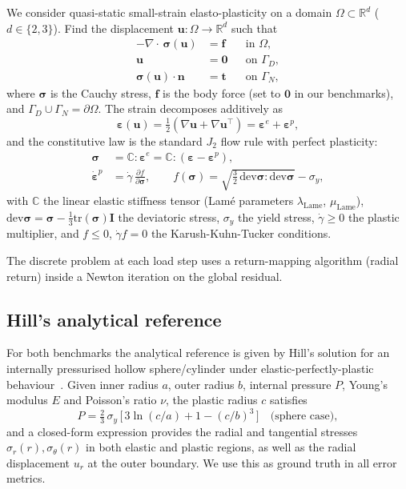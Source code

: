 \documentclass[11pt,a4paper]{article}
\newcommand{\bsigma}{\boldsymbol{\sigma}}
\newcommand{\beps}{\boldsymbol{\varepsilon}}
\newcommand{\bu}{\mathbf{u}}
\newcommand{\bff}{\mathbf{f}}
\newcommand{\bn}{\mathbf{n}}
\newcommand{\bI}{\mathbf{I}}
\newcommand{\dev}{\mathrm{dev}}
\newcommand{\tr}{\mathrm{tr}}
\newcommand{\divg}{\nabla \cdot}
\begin{document}
We consider quasi-static small-strain elasto-plasticity on a domain
$\Omega \subset \mathbb{R}^d$ ($d \in \{2,3\}$).  Find the displacement
$\bu : \Omega \to \mathbb{R}^d$ such that
\begin{align}
    -\divg\,\bsigma(\bu)            &= \bff           &&\text{in } \Omega, \\
    \bu                              &= \mathbf{0}    &&\text{on } \Gamma_D, \\
    \bsigma(\bu)\cdot\bn              &= \mathbf{t}    &&\text{on } \Gamma_N,
\end{align}
where $\bsigma$ is the Cauchy stress, $\bff$ is the body force
(set to $\mathbf{0}$ in our benchmarks), and $\Gamma_D \cup \Gamma_N =
\partial\Omega$.  The strain decomposes additively as
\begin{equation}
    \beps(\bu) = \tfrac{1}{2}(\nabla \bu + \nabla \bu^\top)
              = \beps^e + \beps^p,
\end{equation}
and the constitutive law is the standard $J_2$ flow rule with perfect
plasticity:
\begin{align}
    \bsigma           &= \mathbb{C} : \beps^e
                       = \mathbb{C} : (\beps - \beps^p), \\
    \dot{\beps}^p     &= \dot{\gamma}\,\frac{\partial f}{\partial \bsigma},
                       \qquad
    f(\bsigma) = \sqrt{\tfrac{3}{2}\,\dev\bsigma : \dev\bsigma} - \sigma_y,
\end{align}
with $\mathbb{C}$ the linear elastic stiffness tensor (Lamé parameters
$\lambda_{\mathrm{Lame}}$, $\mu_{\mathrm{Lame}}$), $\dev\bsigma =
\bsigma - \tfrac{1}{3}\tr(\bsigma)\bI$ the deviatoric stress, $\sigma_y$
the yield stress, $\dot\gamma \geq 0$ the plastic multiplier, and
$f \leq 0$, $\dot\gamma f = 0$ the Karush-Kuhn-Tucker conditions.

The discrete problem at each load step uses a return-mapping algorithm
(radial return) inside a Newton iteration on the global residual.

\subsection{Hill's analytical reference}

For both benchmarks the analytical reference is given by Hill's solution
for an internally pressurised hollow sphere/cylinder under
elastic-perfectly-plastic behaviour~\cite{Hill1950}.  Given inner radius
$a$, outer radius $b$, internal pressure $P$, Young's modulus $E$ and
Poisson's ratio $\nu$, the plastic radius $c$ satisfies
\begin{equation}
    P = \tfrac{2}{3}\,\sigma_y\,\bigl[\,3 \ln(c/a) +
        1 - (c/b)^3\,\bigr] \quad \text{(sphere case)},
\end{equation}
and a closed-form expression provides the radial and tangential stresses
$\sigma_r(r), \sigma_\theta(r)$ in both elastic and plastic regions, as
well as the radial displacement $u_r$ at the outer boundary.  We use
this as ground truth in all error metrics.
\end{document}
